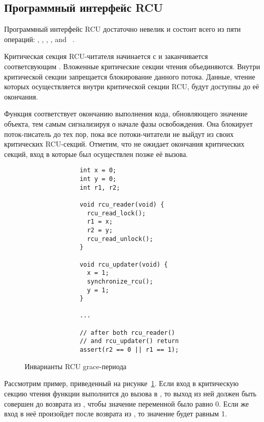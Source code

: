 \subsection{Программный интерфейс RCU} \label{sec:api_usage}
Программный интерфейс RCU достаточно невелик и состоит всего из пяти операций:
, , ,
, and ~\cite{McKenneyOSR08}.

Критическая секция RCU-читателя начинается с 
и заканчивается соответсвующим .
Вложенные критические секции чтения объединяются.
Внутри критической секции запрещается блокирование данного потока.
Данные, чтение которых осуществляется внутри критической секции RCU,
будут доступны до её окончания.

Функция  соответствует окончанию выполнения кода,
обновляющего значение объекта, тем самым сигнализируя о начале фазы освобождения.
Она блокирует поток-писатель до тех пор, пока все потоки-читатели
не выйдут из своих критических RCU-секций.
Отметим, что  не ожидает окончания
критических секций, вход в которые был осуществлен позже её вызова.


\begin{figure}[tbp]
\centering
\footnotesize
\begin{verbatim}
               int x = 0;
               int y = 0;
               int r1, r2;

               void rcu_reader(void) {
                 rcu_read_lock();
                 r1 = x;
                 r2 = y;
                 rcu_read_unlock();
               }

               void rcu_updater(void) {
                 x = 1;
                 synchronize_rcu();
                 y = 1;
               }

               ...

               // after both rcu_reader()
               // and rcu_updater() return
               assert(r2 == 0 || r1 == 1);
\end{verbatim}
\caption{Инварианты RCU grace-периода}
\label{fig:verify_rcu_gp}
\end{figure}

Рассмотрим пример, приведенный на рисунке~\ref{fig:verify_rcu_gp}.
Если вход в критическую секцию чтения функции  выполнится до
вызова  в , то выход из ней должен быть
совершен до возврата из , чтобы значение переменной
 было равно 0. Если же вход в неё произойдет после возврата из
, то значение  будет равным 1.

